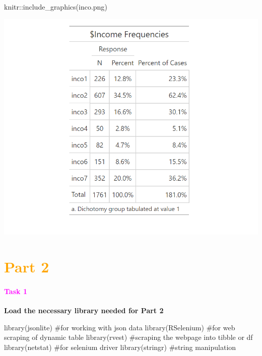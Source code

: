 \documentclass[
]{article}
\newenvironment{Shaded}{}{}
\newcommand{\CommentTok}[1]{\textcolor[rgb]{0.30,0.53,0.42}{#1}}
\newcommand{\FunctionTok}[1]{#1}
\newcommand{\NormalTok}[1]{#1}
\newcommand{\SpecialCharTok}[1]{\textcolor[rgb]{0.00,0.50,0.50}{#1}}
\newcommand{\StringTok}[1]{\textcolor[rgb]{0.01,0.42,0.03}{#1}}
\begin{document}
\begin{Shaded}
\begin{Highlighting}[]
\NormalTok{knitr}\SpecialCharTok{::}\FunctionTok{include\_graphics}\NormalTok{(}\StringTok{\textquotesingle{}inco.png\textquotesingle{}}\NormalTok{)}
\end{Highlighting}
\end{Shaded}

\includegraphics[width=0.6\linewidth]{inco}

\newpage

\hypertarget{section-4}{%
\section{\texorpdfstring{\textbf{\textcolor{orange}{Part 2}}}{}}\label{section-4}}

\hypertarget{section-5}{%
\paragraph{\texorpdfstring{\textbf{\textcolor{magenta}{Task 1}}}{}}\label{section-5}}

\hfill\break

\textbf{Load the necessary library needed for Part 2}

\begin{Shaded}
\begin{Highlighting}[]
\FunctionTok{library}\NormalTok{(jsonlite) }\CommentTok{\#for working with json data}
\FunctionTok{library}\NormalTok{(RSelenium) }\CommentTok{\#for web scraping of dynamic table}
\FunctionTok{library}\NormalTok{(rvest) }\CommentTok{\#scraping the webpage into tibble or df}
\FunctionTok{library}\NormalTok{(netstat) }\CommentTok{\#for selenium driver}
\FunctionTok{library}\NormalTok{(stringr) }\CommentTok{\#string manipulation}
\end{Highlighting}
\end{Shaded}
\end{document}
